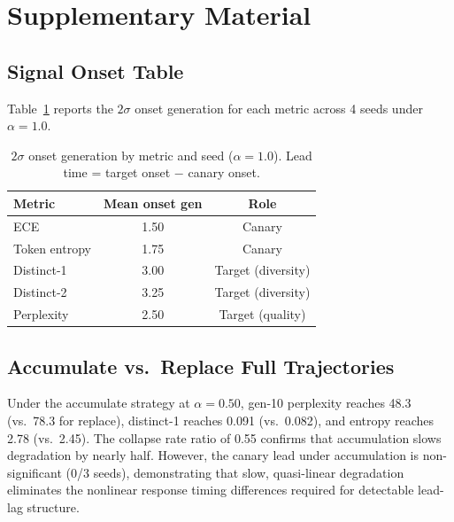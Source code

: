 \documentclass[letterpaper,11pt]{article}
\begin{document}
\section{Supplementary Material}

\subsection{Signal Onset Table}

Table~\ref{tab:onset} reports the $2\sigma$ onset generation for each metric across 4 seeds under $\alpha{=}1.0$.

\begin{table}[h]
\centering
\caption{$2\sigma$ onset generation by metric and seed ($\alpha{=}1.0$). Lead time = target onset $-$ canary onset.}
\label{tab:onset}
\small
\begin{tabular}{@{}lcc@{}}
\toprule
Metric & Mean onset gen & Role \\
\midrule
ECE & 1.50 & Canary \\
Token entropy & 1.75 & Canary \\
Distinct-1 & 3.00 & Target (diversity) \\
Distinct-2 & 3.25 & Target (diversity) \\
Perplexity & 2.50 & Target (quality) \\
\bottomrule
\end{tabular}
\end{table}

\subsection{Accumulate vs.\ Replace Full Trajectories}

Under the accumulate strategy at $\alpha{=}0.50$, gen-10 perplexity reaches 48.3 (vs.\ 78.3 for replace), distinct-1 reaches 0.091 (vs.\ 0.082), and entropy reaches 2.78 (vs.\ 2.45).
The collapse rate ratio of 0.55 confirms that accumulation slows degradation by nearly half.
However, the canary lead under accumulation is non-significant (0/3 seeds), demonstrating that slow, quasi-linear degradation eliminates the nonlinear response timing differences required for detectable lead-lag structure.
\end{document}
